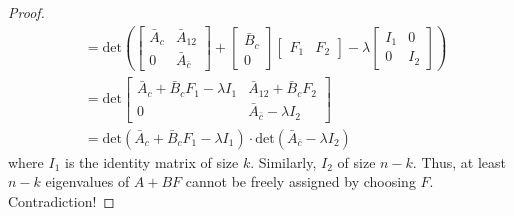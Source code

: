 \documentclass[
]{book}
\theoremstyle{definition}
\theoremstyle{definition}
\theoremstyle{definition}
\theoremstyle{definition}
\theoremstyle{remark}
\begin{document}
\begin{proof}
\begin{equation*}
\begin{split}
      & = \text{det}\left(
         \begin{bmatrix}
            \bar{A}_c & \bar{A}_{12} \\ 0 & \bar{A}_{\bar{c}}
         \end{bmatrix} + \begin{bmatrix}
            \bar{B}_c \\ 0
         \end{bmatrix} \begin{bmatrix}
            F_1 & F_2
         \end{bmatrix} - \lambda \begin{bmatrix}
            I_1 & 0 \\
            0 & I_2
         \end{bmatrix}
      \right) \\
      & = \text{det} \begin{bmatrix}
            \bar{A}_c + \bar{B}_c F_1 - \lambda I_1 & \bar{A}_{12} + \bar{B}_c F_2 \\ 0 & \bar{A}_{\bar{c}} - \lambda I_2
         \end{bmatrix} \\
      & = \text{det}(\bar{A}_c + \bar{B}_c F_1 - \lambda I_1) \cdot \text{det}(\bar{A}_{\bar{c}} - \lambda I_2)
   \end{split}
\end{equation*}
where \(I_1\) is the identity matrix of size \(k\). Similarly, \(I_2\) of size \(n-k\). Thus, at least \(n-k\) eigenvalues of \(A+BF\) cannot be freely assigned by choosing \(F\). Contradiction!


\end{proof}
\end{document}
